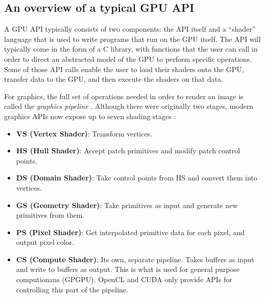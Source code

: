 \documentclass[a4paper,12pt,twoside,openright]{report}
\begin{document}
\subsection{An overview of a typical GPU API}

\label{sec:graphics_api_overview}

A GPU API typically consists of two components: the API itself and a ``shader''
language that is used to write programs that run on the GPU itself. The API
will typically come in the form of a C library, with functions that the user
can call in order to direct an abstracted model of the GPU to perform specific
operations. Some of those API calls enable the user to load their shaders onto
the GPU, transfer data to the GPU, and then execute the shaders on that data.

For graphics, the full set of operations needed in order to render an image is
called the \textit{graphics pipeline} \cite{TripThroughGraphicsPipeline1}.
Although there were originally two stages, modern graphics APIs now expose up
to seven shading stages \cite{TripThroughGraphicsPipeline3}:

\begin{itemize}

    \item \textbf{VS (Vertex Shader)}: Transform vertices.

    \item \textbf{HS (Hull Shader)}: Accept patch primitives and modify patch
    control points.

    \item \textbf{DS (Domain Shader)}: Take control points from HS and convert
    them into vertices.

    \item \textbf{GS (Geometry Shader)}: Take primitives as input and generate
    new primitives from them.

    \item \textbf{PS (Pixel Shader)}: Get interpolated primitive data for each
    pixel, and output pixel color.

    \item \textbf{CS (Compute Shader)}: Its own, separate pipeline. Takes
    buffers as input and write to buffers as output. This is what is used for
    general purpose computionans (GPGPU). OpenCL and CUDA only provide APIs for
    controlling this part of the pipeline.

\end{itemize}
\end{document}
